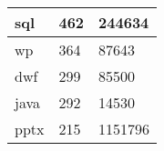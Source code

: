 \begin{table}[!ht]
\begin{tabular}{|l|l|l|}
sql       & 462             & 244634       \\ \hline
wp        & 364             & 87643        \\ \hline
dwf       & 299             & 85500        \\ \hline
java      & 292             & 14530        \\ \hline
pptx      & 215             & 1151796      \\ \hline

\end{tabular}
\end{table}
